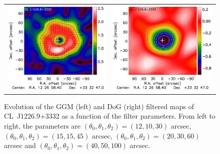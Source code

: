 \documentclass[traditabstract]{aa}
\begin{document}
\begin{figure}[h]
{\begin{tabular}{ll}
\includegraphics[trim=0cm 0.7cm 0cm 0cm, clip=true, scale=1]{Figure/Grad_CLJ1227_40_50_100_noannot.pdf} & 
\includegraphics[trim=2.3cm 0.7cm 0cm 0cm, clip=true, scale=1]{Figure/DoG_CLJ1227_40_50_100_noannot.pdf}
\end{tabular}}
\caption{\footnotesize{Evolution of the GGM (left) and DoG (right) filtered maps of \mbox{CL~J1226.9+3332} as a function of the filter parameters. From left to right, the parameters are $\left(\theta_0, \theta_1, \theta_2\right) = \left(12, 10, 30\right)$ arcsec, $\left(\theta_0, \theta_1, \theta_2\right) = \left(15, 15, 45\right)$ arcsec, $\left(\theta_0, \theta_1, \theta_2\right) = \left(20, 30, 60\right)$ arcsec and $\left(\theta_0, \theta_1, \theta_2\right) = \left(40, 50, 100\right)$ arcsec.}}
\label{fig:filtered_NIKA_maps_evolution}
\end{figure}
\end{document}
